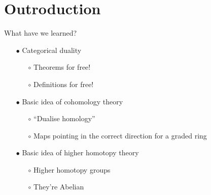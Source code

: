 \section{Outroduction} %

\begin{frame}{What have we learned?}

  \begin{itemize}
    \pause
    \item[$\bullet$] Categorical duality
    \begin{itemize}[nosep]
      \item[$\circ$] Theorems for free!
      \item[$\circ$] Definitions for free! \vspace{1 \baselineskip}
    \end{itemize}
    \pause
    \item[$\bullet$] Basic idea of cohomology theory
    \begin{itemize}[nosep]
      \item[$\circ$] ``Dualise homology''
      \item[$\circ$] Maps pointing in the correct direction for a graded ring \vspace{1 \baselineskip}
    \end{itemize}
    \pause
    \item[$\bullet$] Basic idea of higher homotopy theory
    \begin{itemize}[nosep]
      \item[$\circ$] Higher homotopy groups
      \item[$\circ$] They're Abelian
    \end{itemize}
  \end{itemize}

\end{frame}
